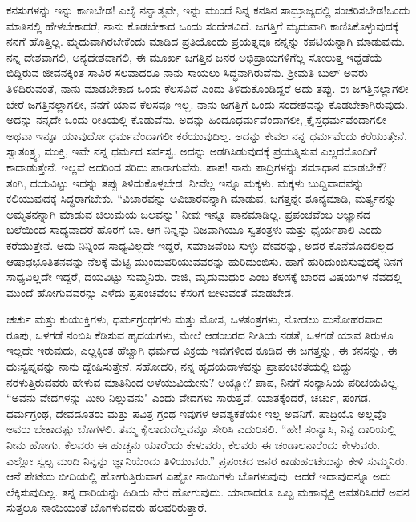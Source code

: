 \vspace{0.1cm}

ಕನಸುಗಳನ್ನು ಇನ್ನು ಕಾಣಬೇಡ! ಎಲೈ ನನ್ನಾತ್ಮವೇ, ಇನ್ನು ಮುಂದೆ ನಿನ್ನ ಕನಸಿನ ಸಾಮ್ರಾಜ್ಯದಲ್ಲಿ ಸಂಚರಿಸಬೇಡ!ಒಂದು ಮಾತಿನಲ್ಲಿ ಹೇಳಬೇಕಾದರೆ, ನಾನು ಕೊಡಬೇಕಾದ ಒಂದು ಸಂದೇಶವಿದೆ. ಜಗತ್ತಿಗೆ ಮೃದುವಾಗಿ ಕಾಣಿಸಿಕೊಳ್ಳುವುದಕ್ಕೆ ನನಗೆ ಹೊತ್ತಿಲ್ಲ. ಮೃದುವಾಗಿರಬೇಕೆಂದು ಮಾಡಿದ ಪ್ರತಿಯೊಂದು ಪ್ರಯತ್ನವೂ ನನ್ನನ್ನು ಕಪಟಿಯನ್ನಾಗಿ ಮಾಡುವುದು. ನನ್ನ ದೇಶವಾಗಲಿ, ಅನ್ಯದೇಶವಾಗಲಿ, ಈ ಮೂರ್ಖ ಜಗತ್ತಿನ ಜನರ ಅಭಿಪ್ರಾಯಗಳಿಗೆಲ್ಲ ಸೋಲುತ್ತ ಇದ್ದೆಡೆಯೆ ಬಿದ್ದಿರುವ ಜೀವನಕ್ಕಿಂತ ಸಾವಿರ ಸಲವಾದರೂ ನಾನು ಸಾಯಲು ಸಿದ್ಧನಾಗಿರುವೆನು. ಶ‍್ರೀಮತಿ ಬುಲ್ ಅವರು ತಿಳಿದಿರುವಂತೆ, ನಾನು ಮಾಡಬೇಕಾದ ಒಂದು ಕೆಲಸವಿದೆ ಎಂದು ತಿಳಿದುಕೊಂಡಿದ್ದರೆ ಅದು ತಪ್ಪು. ಈ ಜಗತ್ತಿನಲ್ಲಾಗಲೀ ಬೇರೆ ಜಗತ್ತಿನಲ್ಲಾಗಲೀ, ನನಗೆ ಯಾವ ಕೆಲಸವೂ ಇಲ್ಲ. ನಾನು ಜಗತ್ತಿಗೆ ಒಂದು ಸಂದೇಶವನ್ನು ಕೊಡಬೇಕಾಗಿರುವುದು. ಅದನ್ನು ನನ್ನದೇ ಒಂದು ರೀತಿಯಲ್ಲಿ ಕೊಡುವೆನು. ಅದನ್ನು ಹಿಂದೂಧರ್ಮವೆಂದಾಗಲೀ, ಕ್ರೈಸ್ತಧರ್ಮವೆಂದಾಗಲೀ ಅಥವಾ ಇನ್ನೂ ಯಾವುದೋ ಧರ್ಮವೆಂದಾಗಲೀ ಕರೆಯುವುದಿಲ್ಲ. ಅದನ್ನು ಕೇವಲ ನನ್ನ ಧರ್ಮವೆಂದು ಕರೆಯುತ್ತೇನೆ. ಸ್ವಾತಂತ್ರ್ಯ, ಮುಕ್ತಿ, ಇವೇ ನನ್ನ ಧರ್ಮದ ಸರ್ವಸ್ವ. ಅದನ್ನು ಅಡಗಿಸಿಡುವುದಕ್ಕೆ ಪ್ರಯತ್ನಿಸುವ ಎಲ್ಲದರೊಂದಿಗೆ ಕಾದಾಡುತ್ತೇನೆ. ಇಲ್ಲವೆ ಅದರಿಂದ ಸರಿದು ಪಾರಾಗುವೆನು. ಪಾಪ! ನಾನು ಪಾದ್ರಿಗಳನ್ನು ಸಮಾಧಾನ ಮಾಡಬೇಕೆ? ತಂಗಿ, ದಯವಿಟ್ಟು ಇದನ್ನು ತಪ್ಪು ತಿಳಿದುಕೊಳ್ಳಬೇಡ. ನೀವೆಲ್ಲ ಇನ್ನೂ ಮಕ್ಕಳು. ಮಕ್ಕಳು ಬುದ್ದಿವಾದವನ್ನು ಕಲಿಯುವುದಕ್ಕೆ ಸಿದ್ಧರಾಗಬೇಕು. “ವಿಚಾರವನ್ನು ಅವಿಚಾರವನ್ನಾಗಿ ಮಾಡುವ, ಜಗತ್ತನ್ನೇ ಶೂನ್ಯಮಾಡಿ, ಮರ್ತ್ಯನನ್ನು ಅಮೃತನನ್ನಾಗಿ ಮಾಡುವ ಚಿಲುಮೆಯ ಜಲವನ್ನು" ನೀವು ಇನ್ನೂ ಪಾನಮಾಡಿಲ್ಲ. ಪ್ರಪಂಚವೆಂಬ ಅಜ್ಞಾನದ ಬಲೆಯಿಂದ ಸಾಧ್ಯವಾದರೆ ಹೊರಗೆ ಬಾ. ಆಗ ನಿನ್ನನ್ನು ನಿಜವಾಗಿಯೂ ಸ್ವತಂತ್ರಳು ಮತ್ತು ಧೈರ್ಯಶಾಲಿ ಎಂದು ಕರೆಯುತ್ತೇನೆ. ಅದು ನಿನ್ನಿಂದ ಸಾಧ್ಯವಿಲ್ಲದೇ ಇದ್ದರೆ, ಸಮಾಜವೆಂಬ ಸುಳ್ಳು ದೇವರನ್ನು, ಅದರ ಕೊನೆಮೊದಲಿಲ್ಲದ ಆಷಾಢಭೂತಿತನವನ್ನು ನೆಲಕ್ಕೆ ಮೆಟ್ಟಿ ಮುಂದುವರಿಯುವವರನ್ನು ಹುರಿದುಂಬಿಸು. ಹಾಗೆ ಹುರಿದುಂಬಿಸುವುದಕ್ಕೆ ನಿನಗೆ ಸಾಧ್ಯವಿಲ್ಲದೇ ಇದ್ದರೆ, ದಯವಿಟ್ಟು ಸುಮ್ಮನಿರು. ರಾಜಿ, ಮೃದುಮಧುರ ಎಂಬ ಕೆಲಸಕ್ಕೆ ಬಾರದ ವಿಷಯಗಳ ನೆವದಲ್ಲಿ ಮುಂದೆ ಹೋಗುವವರನ್ನು ಎಳೆದು ಪ್ರಪಂಚವೆಂಬ ಕೆಸರಿಗೆ ಬೀಳುವಂತೆ ಮಾಡಬೇಡ.


ಚರ್ಚು ಮತ್ತು ಕುಯುಕ್ತಿಗಳು, ಧರ್ಮಗ್ರಂಥಗಳು ಮತ್ತು ಮೋಸ, ಒಳತಂತ್ರಗಳು, ನೋಡಲು ಮನೋಹರವಾದ ರೂಪು, ಒಳಗಡೆ ನಂಬಿಸಿ ಕೆಡಿಸುವ ಹೃದಯಗಳು, ಮೇಲೆ ಆಡಂಬರದ ನೀತಿಯ ನಡತೆ, ಒಳಗಡೆ ಯಾವ ತಿರುಳೂ ಇಲ್ಲದೇ ಇರುವುದು, ಎಲ್ಲಕ್ಕಿಂತ ಹೆಚ್ಚಾಗಿ ಧರ್ಮದ ವಿಕ್ರಯ ಇವುಗಳಿಂದ ಕೂಡಿದ ಈ ಜಗತ್ತನ್ನು, ಈ ಕನಸನ್ನು, ಈ ದುಃಸ್ವಪ್ನವನ್ನು ನಾನು ದ್ವೇಷಿಸುತ್ತೇನೆ. ಸಹೋದರಿ, ನನ್ನ ಹೃದಯದಾಳವನ್ನು ಪ್ರಾಪಂಚಿಕತೆಯಲ್ಲಿ ಬಿದ್ದು ನರಳುತ್ತಿರುವವರು ಹೇಳುವ ಮಾತಿನಿಂದ ಅಳೆಯುವಿಯೇನು? ಅಯ್ಯೋ? ಪಾಪ, ನಿನಗೆ ಸಂನ್ಯಾಸಿಯ ಪರಿಚಯವಿಲ್ಲ. “ಅವನು ವೇದಗಳನ್ನು ಮೀರಿ ನಿಲ್ಲುವನು" ಎಂದು ವೇದಗಳು ಸಾರುತ್ತವೆ. ಯಾತಕ್ಕೆಂದರೆ, ಚರ್ಚು, ಪಂಗಡ, ಧರ್ಮಗ್ರಂಥ, ದೇವದೂತರು ಮತ್ತು ಪವಿತ್ರ ಗ್ರಂಥ ಇವುಗಳ ಆವಶ್ಯಕತೆಯೇ ಇಲ್ಲ ಅವನಿಗೆ. ಪಾದ್ರಿಯೊ ಅಲ್ಲವೊ ಅವರು ಬೇಕಾದಷ್ಟು ಬೊಗಳಲಿ. ತಮ್ಮ ಕೈಲಾದುದೆಲ್ಲವನ್ನೂ ಸೇರಿಸಿ ಎದುರಿಸಲಿ. “ಹೇ! ಸಂನ್ಯಾಸಿ, ನಿನ್ನ ದಾರಿಯಲ್ಲಿ ನೀನು ಹೋಗು. ಕೆಲವರು ಈ ಹುಚ್ಚನು ಯಾರೆಂದು ಕೇಳುವರು, ಕೆಲವರು ಈ ಚಂಡಾಲನಾರೆಂದು ಕೇಳುವರು. ಎಲ್ಲೋ ಸ್ವಲ್ಪ ಮಂದಿ ನಿನ್ನನ್ನು ಜ್ಞಾನಿಯೆಂದು ತಿಳಿಯುವರು.” ಪ್ರಪಂಚದ ಜನರ ಕಾಡುಹರಟೆಯನ್ನು ಕೇಳಿ ಸುಮ್ಮನಿರು. ಆನೆ ಪೇಟೆಯ ಬೀದಿಯಲ್ಲಿ ಹೋಗುತ್ತಿರುವಾಗ ಎಷ್ಟೋ ನಾಯಿಗಳು ಬೊಗಳುವುವು. ಆದರೆ ಇದಾವುದನ್ನೂ ಅದು ಲೆಕ್ಕಿಸುವುದಿಲ್ಲ. ತನ್ನ ದಾರಿಯನ್ನು ಹಿಡಿದು ನೇರ ಹೋಗುವುದು. ಯಾರಾದರೂ ಒಬ್ಬ ಮಹಾವ್ಯಕ್ತಿ ಅವತರಿಸಿದರೆ ಅವನ ಸುತ್ತಲೂ ನಾಯಿಯಂತೆ ಬೊಗಳುವವರು ಹಲವರಿರುತ್ತಾರೆ.


